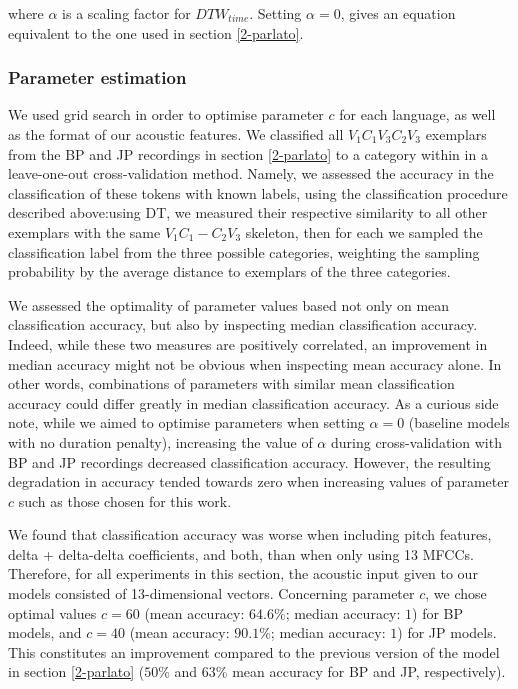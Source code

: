 where $\alpha$ is a scaling factor for $DTW_{time}$. Setting $\alpha = 0$, gives an equation equivalent to the one used in section \ref{2-parlato}.

\subsubsection{Parameter estimation}
We used grid search in order to optimise parameter $c$ for each language, as well as the format of our acoustic features. We classified all $V_1C_1V_3C_2V_3$ exemplars from the BP and JP recordings in section \ref{2-parlato} to a category within  in a leave-one-out cross-validation method. Namely, we assessed the accuracy in the classification of these tokens with known labels, using the classification procedure described above:using DT, we measured their respective similarity to all other exemplars with the same $V_1C_1-C_2V_3$ skeleton, then for each we sampled the classification label from the three possible categories, weighting the sampling probability by the average distance to exemplars of the three categories.

We assessed the optimality of parameter values based not only on mean classification accuracy, but also by inspecting median classification accuracy. Indeed, while these two measures are positively correlated, an improvement in median accuracy might not be obvious when inspecting mean accuracy alone. In other words, combinations of parameters with similar mean classification accuracy could differ greatly in median classification accuracy.
As a curious side note, while we aimed to optimise parameters when setting $\alpha = 0$ (baseline models with no duration penalty), increasing the value of $\alpha$ during cross-validation with BP and JP recordings decreased classification accuracy. However, the resulting degradation in accuracy tended towards zero when increasing values of parameter $c$ such as those chosen for this work.

We found that classification accuracy was worse when including pitch features, delta + delta-delta coefficients, and both, than when only using 13 MFCCs. Therefore, for all experiments in this section, the acoustic input given to our models consisted of 13-dimensional vectors. Concerning parameter $c$, we chose optimal values $c = 60$ (mean accuracy: $64.6\%$; median accuracy: $1$) for BP models, and $c = 40$ (mean accuracy: $90.1\%$; median accuracy: $1$) for JP models. This constitutes an improvement compared to the previous version of the model in section \ref{2-parlato} ($50\%$ and $63\%$ mean accuracy for BP and JP, respectively). 

